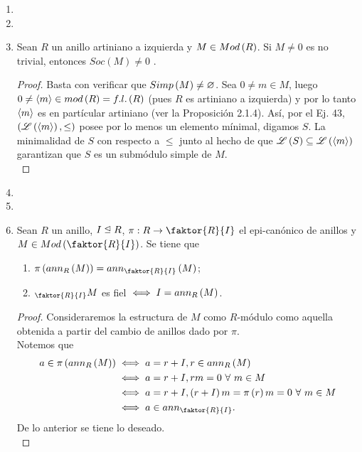 \documentclass{article}
\newcommand{\socle}[1]{
	Soc\lrprth{#1}
}
\begin{document}
\begin{enumerate}[label=\textbf{Ej \arabic*.}]
\begin{proof}
		 Se sigue de aplicar el inciso anterior al modulo semisimple $M':=\socle{M}$.\\
		\end{proof}
		\item 
		\item
		\item Sean $R$ un anillo artiniano a izquierda y $M\in Mod\left(R\right)$. Si $M\neq 0$ es no trivial, entonces $Soc(M)\neq 0$ . 
		\begin{proof}
			Basta con verificar que $Simp\left(M\right)\neq\varnothing$. Sea $0\neq m\in M$, luego $0\neq\left< m\right>\in mod\left(R\right)=f.l.\left(R\right)$ (pues $R$ es artiniano a izquierda) y por lo tanto $\left< m\right>$ es en partícular artiniano (ver la Proposición 2.1.4). Así, por el Ej. 43, $\left(\mathscr{L}\left(\left< m\right>\right),\leq\right)$ posee por lo menos un elemento mínimal, digamos $S$. La minimalidad de $S$ con respecto a $\leq$ junto al hecho de que $\mathscr{L}\left(S\right)\subseteq\mathscr{L}\left(\left< m\right>\right)$ garantizan que $S$ es un submódulo simple de $M$.\\
		\end{proof}
		\item
		\item
		\item Sean $R$ un anillo, $I\subnormeq R$, $\pi:R\to\faktor{R}{I}$ el epi-canónico de anillos y $M\in Mod\lrprth{\faktor{R}{I}}$. Se tiene que
		\begin{enumerate}
			\item $\pi\lrprth{ann_R\lrprth{M}}=ann_{\faktor{R}{I}}\lrprth{M}$;
			\item $\ringmod{\faktor{R}{I}}{M}{l}$ es fiel $\iff I=ann_R \left(M\right)$.
		\end{enumerate}
		\begin{proof}
			Consideraremos la estructura de $M$ como $R$-módulo como aquella obtenida a partir del cambio de anillos dado por $\pi$.\\
			 Notemos que
			 \begin{align*}
				a\in\pi\lrprth{ann_R\lrprth{M}}&\iff  a=r+I, r\in ann_{R}\lrprth{M}\\
				&\iff  a=r+I, rm=0\ \forall\ m\in M\\
				&\iff  a=r+I, \lrprth{r+I}m=\pi\lrprth{r}m=0\ \forall\ m\in M\\
				&\iff  a\in ann_{\faktor{R}{I}}.
			\end{align*}
			De lo anterior se tiene lo deseado.\\
			

\end{proof}
\end{enumerate}
\end{document}
